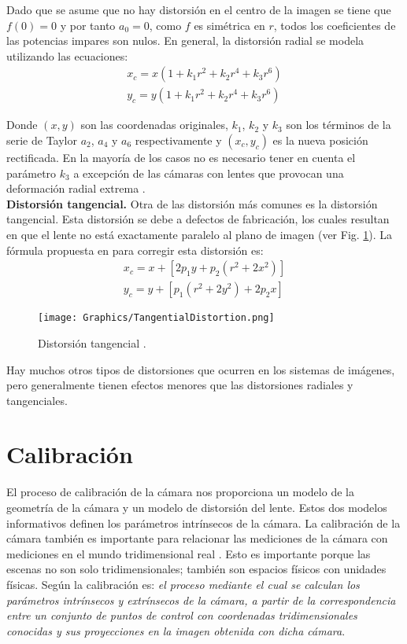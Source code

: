 Dado que se asume que no hay distorsión en el centro de la imagen se tiene que $f(0)=0$ y por tanto $a_0=0$, como $f$ es simétrica en $r$, todos los coeficientes de las potencias impares son nulos. En general, la distorsión radial se modela utilizando las ecuaciones:
\begin{gather*}
    x_c = x(1 + k_1 r^2 + k_2 r^4 + k_3 r^6)\\
    y_c = y(1 + k_1 r^2 + k_2 r^4 + k_3 r^6)
\end{gather*}

Donde $(x, y)$ son las coordenadas originales, $k_1$, $k_2$ y $k_3$ son los términos de la serie de Taylor $a_2$, $a_4$ y $a_6$ respectivamente y $(x_c, y_c)$ es la nueva posición rectificada. En la mayoría de los casos no es necesario tener en cuenta el parámetro $k_3$ a excepción de las cámaras con lentes que provocan una deformación radial extrema \cite{David}.\\

\textbf{Distorsión tangencial.}
Otra de las distorsión más comunes es la distorsión tangencial. Esta distorsión se debe a defectos de fabricación, los cuales resultan en que el lente no está exactamente paralelo al plano de imagen (ver Fig. \ref{fig:TangentialDistortion}). La fórmula propuesta en \cite{GaryAdrian} para corregir esta distorsión es:
\begin{gather*}
    x_c = x + [2p_1y + p_2(r^2 + 2x^2)]\\
    y_c = y + [p_1(r^2 + 2y^2) + 2p_2x]
\end{gather*}

\begin{figure}[h!]
	\centering
	\texttt{[image: Graphics/TangentialDistortion.png]}
	\caption{Distorsión tangencial \cite{David}.}
	\label{fig:TangentialDistortion}
\end{figure}

Hay muchos otros tipos de distorsiones que ocurren en los sistemas de imágenes, pero generalmente tienen efectos menores que las distorsiones radiales y tangenciales.

\section{Calibración}

El proceso de calibración de la cámara nos proporciona un modelo de la geometría de la cámara y un modelo de distorsión del lente. Estos dos modelos informativos definen los parámetros intrínsecos de la cámara. La calibración de la cámara también es importante para relacionar las mediciones de la cámara con mediciones en el mundo tridimensional real \cite{GaryAdrian}. Esto es importante porque las escenas no son solo tridimensionales; también son espacios físicos con unidades físicas. Según \cite{GaryAdrian} la calibración es: \textit{el proceso mediante el cual se calculan los parámetros intrínsecos y extrínsecos de la cámara, a partir de la correspondencia entre un conjunto de puntos de control con coordenadas tridimensionales conocidas y sus proyecciones en la imagen obtenida con dicha cámara}.

